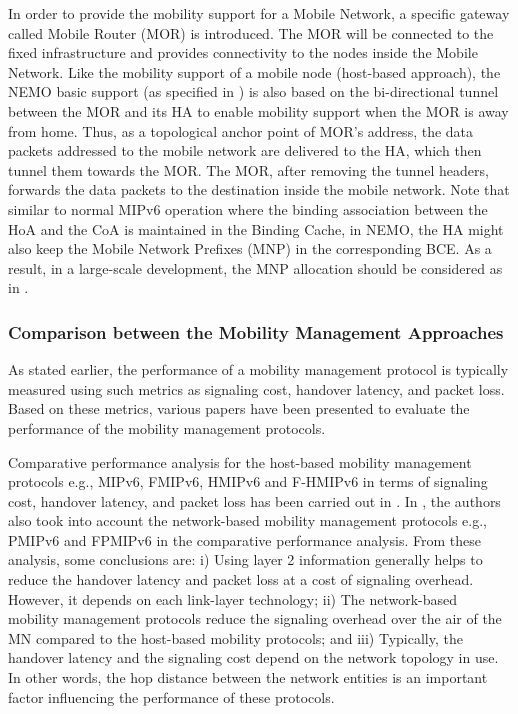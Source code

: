 In order to provide the mobility support for a Mobile Network, a specific gateway called Mobile Router (MOR) is introduced. The MOR will be connected to the fixed infrastructure and provides connectivity to the nodes inside the Mobile Network. Like the mobility support of a mobile node (host-based approach), the NEMO basic support (as specified in \cite{NEMO}) is also based on the bi-directional tunnel between the MOR and its HA to enable mobility support when the MOR is away from home. Thus, as a topological anchor point of MOR's address, the data packets addressed to the mobile network are delivered to the HA, which then tunnel them towards the MOR. The MOR, after removing the tunnel headers, forwards the data packets to the destination inside the mobile network. Note that similar to normal MIPv6 operation where the binding association between the HoA and the CoA is maintained in the Binding Cache, in NEMO, the HA might also keep the Mobile Network Prefixes (MNP) in the corresponding BCE. As a result, in a large-scale development, the MNP allocation should be considered as in \cite{NEMO_DHCP}. 
 
\subsubsection{Comparison between the Mobility Management Approaches}
As stated earlier, the performance of a mobility management protocol is typically measured using such metrics as signaling cost, handover latency, and packet loss. Based on these metrics, various papers have been presented to evaluate the performance of the mobility management protocols. 

Comparative performance analysis for the host-based mobility management protocols e.g., MIPv6, FMIPv6, HMIPv6 and F-HMIPv6 in terms of signaling cost, handover latency, and packet loss has been carried out in \cite{HO_comparison_Montavont, HO_comparison_Makaya,HO_comparison_Costa}. In \cite{HO_comparison_Lee,HO_comparison_Lee_2,HO_comparison_Lee_3}, the authors also took into account the network-based mobility management protocols e.g., PMIPv6 and FPMIPv6 in the comparative performance analysis. From these analysis, some conclusions are: i) Using layer 2 information generally helps to reduce the handover latency and packet loss at a cost of signaling overhead. However, it depends on each link-layer technology; ii) The network-based mobility management protocols reduce the signaling overhead over the air of the MN compared to the host-based mobility protocols; and iii) Typically, the handover latency and the signaling cost depend on the network topology in use. In other words, the hop distance between the network entities is an important factor influencing the performance of these protocols.  

